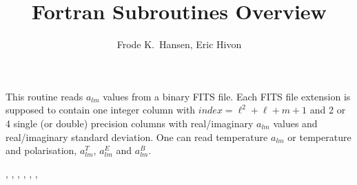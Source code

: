
\sloppy


\title{\healpix Fortran Subroutines Overview}
 \section[fits2alms*]{ }
\label{sub:fits2alms}
\author{Frode K.~Hansen, Eric Hivon}

\begin{facility}
{This routine reads  $a_{lm}$  values from a binary FITS file. Each FITS file
  extension is supposed to contain one integer column with
  $index=\ell^2+\ell+m+1$  and 2 or 4 single (or double) precision columns 
with real/imaginary  $a_{lm}$  values and real/imaginary   standard deviation. 
One can read temperature $a_{lm}$ or temperature and polarisation, $a^T_{lm}$, $a^E_{lm}$ and $a^B_{lm}$.}
{\modFitstools}
\end{facility}

\begin{f90format}
{%
, %
, %
, %
, %
, %
, %
}
\end{f90format}

